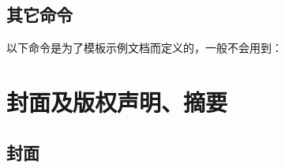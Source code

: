 \subsection*{其它命令}

以下命令是为了模板示例文档而定义的，一般不会用到：
\begin{latex}
\TeXLive   %
\zzuthesis %
\version   %
\end{latex}

\section{封面及版权声明、摘要}
\label{sec:cover}

\subsection*{封面}

